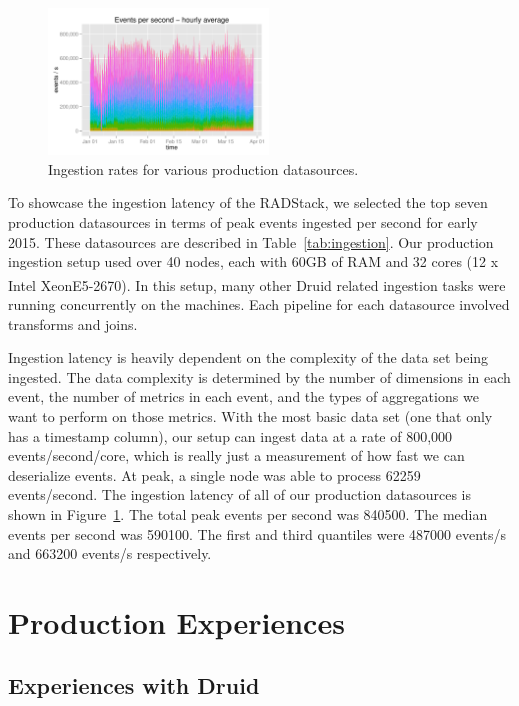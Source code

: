 \documentclass{vldb}
\begin{document}
\begin{figure}
\centering
\includegraphics[width = 2.3in]{radstack-event-throughput}
\caption{Ingestion rates for various production datasources.}
\label{fig:ingestion_rates}
\end{figure}

To showcase the ingestion latency of the RADStack, we selected the top seven
production datasources in terms of peak events ingested per second for early
2015. These datasources are described in Table~\ref{tab:ingestion}. Our
production ingestion setup used over 40 nodes, each with 60GB of RAM and 32
cores (12 x Intel\textsuperscript\textregistered
Xeon\textsuperscript\textregistered E5-2670). In this setup, many other Druid
related ingestion tasks were running concurrently on the machines. Each
pipeline for each datasource involved transforms and joins.

Ingestion latency is heavily dependent on the complexity of the data set being
ingested. The data complexity is determined by the number of dimensions in each
event, the number of metrics in each event, and the types of aggregations we
want to perform on those metrics. With the most basic data set (one that only
has a timestamp column), our setup can ingest data at a rate of 800,000
events/second/core, which is really just a measurement of how fast we can
deserialize events. At peak, a single node was able to process 62259
events/second. The ingestion latency of all of our production datasources is
shown in Figure~\ref{fig:ingestion_rates}. The total peak events per second was
840500. The median events per second was 590100. The first and third quantiles
were 487000 events/s and 663200 events/s respectively. 

\section{Production Experiences}
\label{sec:experiences}

\subsection{Experiences with Druid}
\end{document}
